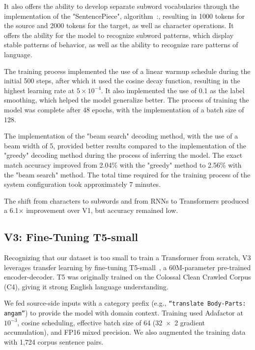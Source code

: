 \documentclass[conference]{IEEEtran}
\begin{document}
It also offers the ability to develop separate subword vocabularies through the implementation of the "SentencePiece",  algorithm~\cite{kudo2018sentencepiece}:, resulting in 1000 tokens for the source and 2000 tokens for the target, as well as character operations. It offers the ability for the model to recognize subword patterns, which display stable patterns of behavior, as well as the ability to recognize rare patterns of language.

The training process implemented the use of a linear warmup schedule during the initial 500 steps, after which it used the cosine decay function, resulting in the highest learning rate at $5 \times 10^{-4}$. It also implemented the use of 0.1 as the label smoothing, which helped the model generalize better. The process of training the model was complete after 48 epochs, with the implementation of a batch size of 128.

The implementation of the "beam search" decoding method, with the use of a beam width of 5, provided better results compared to the implementation of the "greedy" decoding method during the process of inferring the model. The exact match accuracy improved from 2.04\% with the "greedy" method to 2.56\% with the "beam search" method. The total time required for the training process of the system configuration took approximately 7 minutes.

The shift from characters to subwords and from RNNs to Transformers produced a 6.1$\times$ improvement over V1, but accuracy remained low.

\subsection{V3: Fine-Tuning T5-small}

Recognizing that our dataset is too small to train a Transformer from scratch, V3 leverages transfer learning by fine-tuning T5-small~\cite{raffel2020t5}, a 60M-parameter pre-trained encoder-decoder. T5 was originally trained on the Colossal Clean Crawled Corpus (C4), giving it strong English language understanding.

We fed source-side inputs with a category prefix (e.g., \texttt{``translate Body-Parts: angam''}) to provide the model with domain context. Training used Adafactor at $10^{-3}$, cosine scheduling, effective batch size of 64 (32~$\times$~2 gradient accumulation), and FP16 mixed precision. We also augmented the training data with 1,724 corpus sentence pairs.
\end{document}
